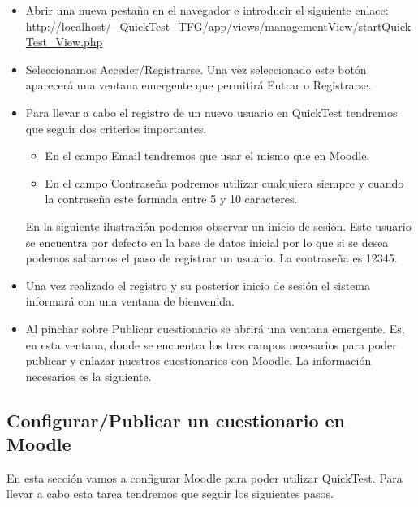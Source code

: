 \begin{itemize}

	\item Abrir una nueva pestaña en el navegador e introducir el siguiente enlace: \url{http://localhost/_QuickTest_TFG/app/views/managementView/startQuickTest_View.php}
	
	\item Seleccionamos Acceder/Registrarse. Una vez seleccionado este botón aparecerá una ventana emergente que permitirá Entrar o Registrarse.
	
	\item Para llevar a cabo el registro de un nuevo usuario en QuickTest tendremos que seguir dos criterios importantes.
	\begin{itemize}
         \item En el campo Email tendremos que usar el mismo que en Moodle.
         \item En el campo Contraseña podremos utilizar cualquiera siempre y cuando la contraseña este formada entre 5 y 10 caracteres.
    \end{itemize}
    En la siguiente ilustración podemos observar un inicio de sesión. Este usuario se encuentra por defecto en la base de datos inicial por lo que si se desea podemos saltarnos el paso de registrar un usuario. La contraseña es 12345. 
    \item Una vez realizado el registro y su posterior inicio de sesión el sistema informará con una ventana de bienvenida. 
    
    \item Al pinchar sobre Publicar cuestionario se abrirá una ventana emergente. Es, en esta ventana, donde se encuentra los tres campos necesarios para poder publicar y enlazar nuestros cuestionarios con Moodle. La información necesarios es la siguiente. 
    
	
\end{itemize}


\subsection{Configurar/Publicar un cuestionario en Moodle}

En esta sección vamos a configurar Moodle para poder utilizar QuickTest. Para llevar a cabo esta tarea tendremos que seguir los siguientes pasos.

